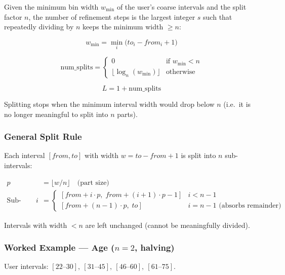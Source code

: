 \documentclass[12pt,a4paper]{article}
\begin{document}
Given the minimum bin width $w_{\min}$ of the user's coarse intervals and the
split factor $n$, the number of refinement steps is the largest integer $s$
such that repeatedly dividing by $n$ keeps the minimum width $\geq n$:

\begin{equation}
  w_{\min} = \min_{i}\bigl(to_i - from_i + 1\bigr)
\end{equation}

\begin{equation}
  \text{num\_splits} = \begin{cases}
    0 & \text{if } w_{\min} < n \\
    \lfloor \log_n(w_{\min}) \rfloor & \text{otherwise}
  \end{cases}
\end{equation}

\begin{equation}
  \boxed{L = 1 + \text{num\_splits}}
\end{equation}

Splitting stops when the minimum interval width would drop below $n$ (i.e.\
it is no longer meaningful to split into $n$ parts).

\subsubsection{General Split Rule}

Each interval $[from, to]$ with width $w = to - from + 1$ is split into
$n$ sub-intervals:

\begin{align}
  p &= \lfloor w / n \rfloor \quad\text{(part size)} \\
  \text{Sub-interval } i &=
    \begin{cases}
      [from + i \cdot p,\; from + (i+1) \cdot p - 1] & i < n-1 \\
      [from + (n-1) \cdot p,\; to]                    & i = n-1 \text{ (absorbs remainder)}
    \end{cases}
\end{align}

Intervals with width $< n$ are left unchanged (cannot be meaningfully divided).

\subsubsection{Worked Example — Age ($n=2$, halving)}

User intervals: $[22\text{--}30],\ [31\text{--}45],\ [46\text{--}60],\ [61\text{--}75]$.
\end{document}
